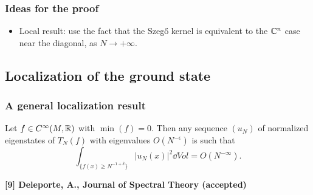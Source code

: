 \documentclass[mathserif]{beamer}
\begin{document}
\begin{frame}
  \frametitle{Ideas for the proof}
  \begin{itemize}
  \item Local result: use the fact that the Szeg\H{o} kernel is
    equivalent to the $\mathbb{C}^n$ case near the diagonal, as $N\to
    +\infty$.
  \end{itemize}
\end{frame}

\subsection{Localization of the ground state}
\begin{frame}
  \frametitle{A general localization result}
  \begin{prop}
    Let $f\in C^{\infty}(M,\mathbb{R})$ with $\min(f)=0$.
    Then any sequence $(u_N)$ of normalized eigenstates of $T_N(f)$
    with eigenvalues $O(N^{-\epsilon})$ is such that
$$\int_{\{f(x)\geq N^{-1+\delta}\}}|u_N(x)|^2 \dd Vol=O(N^{-\infty}).$$
  \end{prop}


\vspace{2em}

\small{{\bfseries [9] Deleporte, A., Journal of Spectral Theory
    (accepted)}}
\end{frame}
\end{document}
